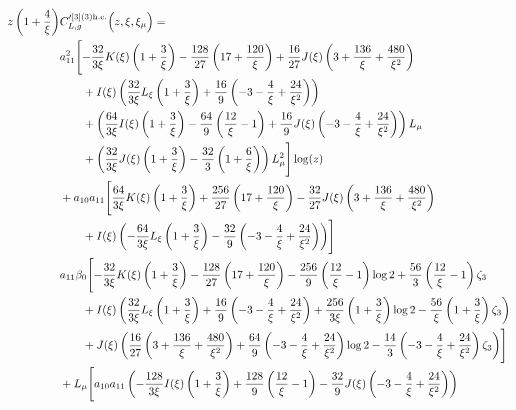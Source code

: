 \documentclass[a4paper]{article}
\begin{document}
	\endgroup
\begingroup
\allowdisplaybreaks
\begin{align}
		z \left(1 + \frac{4}{\xi}\right) &C_{L,g}'^{[3](3) \rm h.e.}\Bigl(z,\xi,\xi_\mu\Bigr)=\notag \\
		& a_{11}^2 \Biggl[ -\frac{32}{3 \xi} K(\xi) \left(1 + \frac{3}{\xi}\right) - \frac{128}{27} \left(17 + \frac{120}{\xi}\right) + \frac{16}{27} J(\xi) \left(3 + \frac{136}{\xi} + \frac{480}{\xi^2}\right) \notag\\
		&\qquad + I(\xi) \left(\frac{32}{3\xi} L_\xi \left(1 + \frac{3}{\xi}\right) + \frac{16}{9} \left(-3 - \frac{4}{\xi} + \frac{24}{\xi^2}\right)\right) \notag\\
	 	& \qquad + \left(\frac{64}{3\xi} I(\xi) \left(1 + \frac{3}{\xi}\right) - \frac{64}{9} \left(\frac{12}{\xi} - 1\right) + \frac{16}{9} J(\xi) \left(-3 - \frac{4}{\xi} + \frac{24}{\xi^2}\right)\right) L_\mu \notag\\
		& \qquad + \left(\frac{32}{3\xi} J(\xi) \left(1 + \frac{3}{\xi}\right) - \frac{32}{3} \left(1 + \frac{6}{\xi}\right)\right) L_\mu^2\Biggr] \log(z) \notag\\
		& + a_{10} a_{11} \Biggl[ \frac{64}{3\xi} K(\xi) \left(1 + \frac{3}{\xi}\right) + \frac{256}{27} \left(17 + \frac{120}{\xi}\right) - \frac{32}{27} J(\xi) \left(3 + \frac{136}{\xi} + \frac{480}{\xi^2} \right) \notag\\
		& \qquad + I(\xi) \left(-\frac{64}{3\xi} L_\xi \left(1 + \frac{3}{\xi}\right) - \frac{32}{9} \left(-3 - \frac{4}{\xi} + \frac{24}{\xi^2}\right)\right)\Biggr] \notag\\
		& a_{11} \beta_0 \Biggl[-\frac{32}{3\xi} K(\xi) \left(1 + \frac{3}{\xi}\right) - \frac{128}{27} \left(17 + \frac{120}{\xi}\right) -	\frac{256}{9} \left(\frac{12}{\xi} - 1\right) \log 2 + \frac{56}{3} \left(\frac{12}{\xi} - 1\right) \zeta_3\notag \\
		& \qquad + I(\xi) \left(\frac{32}{3\xi} L_\xi \left(1 + \frac{3}{\xi}\right) + \frac{16}{9} \left(-3 - \frac{4}{\xi} + \frac{24}{\xi^2}\right) + \frac{256}{3\xi} \left(1 + \frac{3}{\xi}\right) \log 2 - \frac{56}{\xi} \left(1 + \frac{3}{\xi}\right) \zeta_3\right) \notag\\
		& \qquad + J(\xi) \left( \frac{16}{27} \left(3 + \frac{136}{\xi} + \frac{480}{\xi^2}\right) + \frac{64}{9} \left(-3 - \frac{4}{\xi} + \frac{24}{\xi^2}\right) \log 2 - \frac{14}{3} \left(-3 - \frac{4}{\xi} + \frac{24}{\xi^2}\right) \zeta_3\right)\Biggr] \notag\\
		& + L_\mu \Biggl[ a_{10} a_{11} \left(-\frac{128}{3\xi} I(\xi) \left(1 + \frac{3}{\xi}\right) + \frac{128}{9} \left(\frac{12}{\xi} - 1\right) - \frac{32}{9} J(\xi) \left(-3 - \frac{4}{\xi} + \frac{24}{\xi^2}\right)\right) \notag\\

\end{align}
\end{document}
